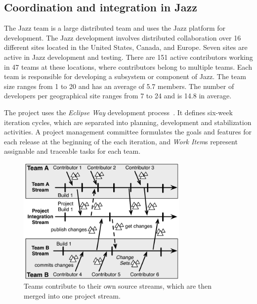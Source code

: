 \documentclass[12pt,oneside]{book}
\newcommand{\et}[1]{\emph{#1}}
\begin{document}
\subsection{Coordination and integration in Jazz}
The Jazz team is a large distributed team and uses the Jazz platform for
development. The Jazz development involves distributed collaboration over 16
different sites located in the United States, Canada, and Europe. Seven sites are
active in Jazz development and testing. There are 151 active contributors
working in 47 teams at these locations, where contributors belong to multiple
teams. Each team is responsible for developing a subsystem or component of Jazz.
The team size ranges from 1 to 20 and has an average of 5.7 members. The number
of developers per geographical site ranges from 7 to 24 and is 14.8 in average.

The project uses the \emph{Eclipse Way} development process~\cite{frost:ieeesoftware:2007}.
It defines six-week iteration cycles, which are separated into planning,
development and stabilization activities. A project management committee
formulates the goals and features for each release at the beginning of the each
iteration, and \et{Work Item}s represent assignable and traceable tasks for each
team.

\begin{figure}[t]
\begin{center}
\includegraphics[width=8.3cm]{figures/BuildResult}
\caption{Teams contribute to their own source streams, which are then merged into one project stream.}
\label{fig:BuildResult}
\end{center}
\end{figure}
\end{document}
